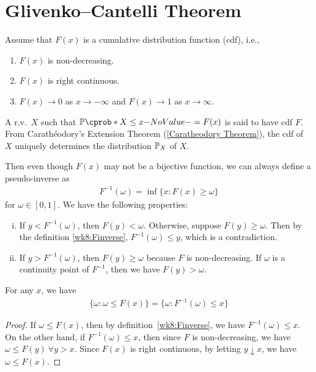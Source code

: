 \documentclass[12pt]{article}
\begin{document}

\section{Glivenko–Cantelli Theorem}

Assume that $F(x)$ is a cumulative distribution function (cdf), i.e., 
\begin{enumerate}[-]
\item $F(x)$ is non-decreasing.
\item $F(x)$ is right continuous.
\item $F(x) \to 0$ as $x \to -\infty$ and $F(x) \to1$ as $x \to \infty$.
\end{enumerate}
A r.v.\ $X$ such that $\P(X\leq x) = F(x)$ is said to have cdf $F$. From Carath{\'e}odory's Extension Theorem (\cref{Caratheodory Theorem}), the cdf of $X$ uniquely determines the distribution $\P_X$ of $X$.

Then even though $F(x)$ may not be a bijective function, we can always define a pseudo-inverse as
\begin{align}\label{wk8:Finverse}
F^{-1}(\omega)= \inf \{x: F(x)\geq \omega\}  
\end{align}
for $\omega \in [0,1]$. We have the following properties:
\begin{enumerate}[(i)]
\item If $y < F^{-1}(\omega)$, then $F(y)< \omega$.
Otherwise, suppose $F(y) \geq \omega$. Then by the definition \cref{wk8:Finverse}, $F^{-1}(\omega)\leq y$, which is a contradiction.
\item If $y > F^{-1}(\omega)$, then $F(y)\geq \omega$ because $F$ is non-decreasing. If $\omega$ is a continuity point of $F^{-1}$, then we have $F(y) > \omega$.
\end{enumerate}

\begin{Lemma} \label{wk8:lemma:set}
For any $x$, we have
\begin{align*}
\{\omega: \omega \leq F(x)\}=\{\omega: F^{-1}(\omega)\leq x\}
\end{align*}
\end{Lemma}
%
\begin{proof}
If $\omega \leq F(x)$, then by definition~\cref{wk8:Finverse}, we have $F^{-1}(\omega)\leq x$. On the other hand, if $F^{-1}(\omega) \leq x$, then since $F$ is non-decreasing, we have $\omega \leq F(y) \ \forall y > x$. Since $F(x)$ is right continuous, by letting $y \downarrow x$, we have $\omega \leq F(x)$.
\end{proof}
\end{document}
